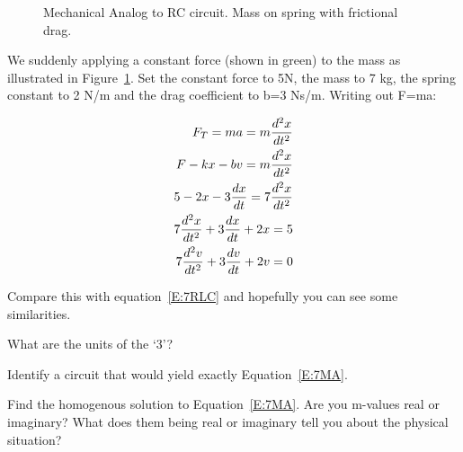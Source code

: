 \begin{figure}[H]
\begin{center}
\caption{Mechanical Analog to RC circuit. Mass on spring with frictional drag.}
\label{F:7RCM}
\end{center}
\end{figure}

We suddenly applying a constant force (shown in green) to the mass as illustrated in Figure~\ref{F:7RCM}. Set the constant force to 5N, the mass to 7 kg, the spring constant to 2 N/m and the drag coefficient to b=3 Ns/m. Writing out F=ma:

\begin{align}
F_T=ma=m\frac{d^2x}{dt^2}\notag\\
F-kx-bv=m\frac{d^2x}{dt^2}\notag\\
5-2x-3\frac{dx}{dt}=7\frac{d^2x}{dt^2}\notag\\
7\frac{d^2x}{dt^2}+3\frac{dx}{dt}+2x=5 \\
7\frac{d^2v}{dt^2}+3\frac{dv}{dt}+2v=0 \label{E:7MA}
\end{align}

Compare this with equation~\eqref{E:7RLC} and hopefully you can see some similarities.

\begin{alevel}
What are the units of the `3'?
\end{alevel}

\begin{blevel}
Identify a circuit that would yield exactly Equation~\eqref{E:7MA}.
\end{blevel}

\begin{clevel}
Find the homogenous solution to Equation~\eqref{E:7MA}. Are you m-values real or imaginary? What does them being real or imaginary tell you about the physical situation?
\end{clevel}

